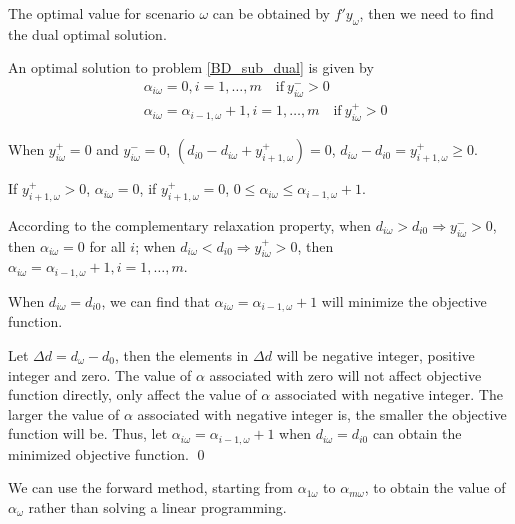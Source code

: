 The optimal value for scenario $\omega$ can be obtained by $f{'} y_{\omega}$, then we need to find the dual optimal solution.


\begin{thm}\label{optimal_sol_sub_dual}
  An optimal solution to problem \eqref{BD_sub_dual} is given by 
\begin{equation}\label{BD_sub_simplified}
  \begin{aligned}
    & \alpha_{i \omega} =0, i =1,\ldots,m \quad \text{if}~  y_{i \omega}^{-} > 0   \\
    & \alpha_{i \omega} = \alpha_{i-1, \omega}+1, i =1,\ldots,m \quad \text{if}~ y_{i \omega}^{+} > 0
  \end{aligned}
\end{equation}
\end{thm}

When $y_{i \omega}^{+} = 0$ and $y_{i \omega}^{-} = 0$, $\left(d_{i 0}- d_{i \omega} + y_{i+1, \omega}^{+}\right) = 0$, $d_{i \omega}- d_{i 0} = y_{i+1, \omega}^{+} \geq 0$.

If $y_{i+1, \omega}^{+} > 0$, $\alpha_{i \omega} = 0$,
if $y_{i+1, \omega}^{+} = 0$, $0 \leq \alpha_{i \omega} \leq \alpha_{i-1, \omega} +1$.

\begin{pf}
  According to the complementary relaxation property, when
$d_{i \omega} > d_{i 0} \Rightarrow y_{i \omega}^{-} >0$, then $\alpha_{i \omega} =0$ for all $i$; when $d_{i \omega} < d_{i 0} \Rightarrow y_{i \omega}^{+} >0$, then $\alpha_{i \omega} = \alpha_{i-1,\omega} +1, i =1,\ldots,m$. 

When $d_{i \omega} = d_{i 0}$,  we can find that $\alpha_{i \omega} = \alpha_{i-1, \omega} + 1$ will minimize the objective function.

Let $\Delta d = d_{\omega} - d_0$, then the elements in $\Delta d$ will be negative integer, positive integer and zero. The value of $\alpha$ associated with zero will not affect objective function directly, only affect the value of $\alpha$ associated with negative integer. The larger the value of $\alpha$ associated with negative integer is, the smaller the objective function will be. Thus, let $\alpha_{i \omega} = \alpha_{i-1, \omega} + 1$ when $d_{i \omega} = d_{i 0}$ can obtain the minimized objective function.
\qed
\end{pf}

We can use the forward method, starting from $\alpha_{1 \omega}$ to $\alpha_{m \omega}$, to obtain the value of $\alpha_{\omega}$ rather than solving a linear programming.


